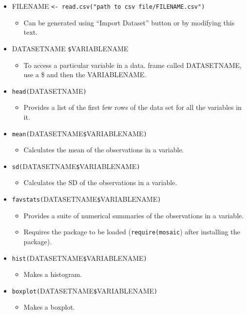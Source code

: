 \documentclass[]{book}
\providecommand{\tightlist}{%
  \setlength{\itemsep}{0pt}\setlength{\parskip}{0pt}}
\begin{document}
\begin{itemize}
\item
  FILENAME
  \texttt{\textless{}-\ read.csv("path\ to\ csv\ file/FILENAME.csv")}

  \begin{itemize}
  \tightlist
  \item
    Can be generated using ``Import Dataset'' button or by modifying
    this text.
  \end{itemize}
\item
  DATASETNAME \texttt{\$}VARIABLENAME

  \begin{itemize}
  \tightlist
  \item
    To access a particular variable in a data. frame called DATASETNAME,
    use a \$ and then the VARIABLENAME.
  \end{itemize}
\item
  \texttt{head(}DATASETNAME\texttt{)}

  \begin{itemize}
  \tightlist
  \item
    Provides a list of the first few rows of the data set for all the
    variables in it.
  \end{itemize}
\item
  \texttt{mean(}DATASETNAME\texttt{\$}VARIABLENAME\texttt{)}

  \begin{itemize}
  \tightlist
  \item
    Calculates the mean of the observations in a variable.
  \end{itemize}
\item
  \texttt{sd(}DATASETNAME\texttt{\$}VARIABLENAME\texttt{)}

  \begin{itemize}
  \tightlist
  \item
    Calculates the SD of the observations in a variable.
  \end{itemize}
\item
  \texttt{favstats(}DATASETNAME\texttt{\$}VARIABLENAME\texttt{)}

  \begin{itemize}
  \item
    Provides a suite of numerical summaries of the observations in a
    variable.
  \item
    Requires the package to be loaded (\texttt{require(mosaic}) after
    installing the package).
  \end{itemize}
\item
  \texttt{hist(}DATASETNAME\texttt{\$}VARIABLENAME\texttt{)}

  \begin{itemize}
  \tightlist
  \item
    Makes a histogram.
  \end{itemize}
\item
  \texttt{boxplot(}DATASETNAME\texttt{\$}VARIABLENAME\texttt{)}

  \begin{itemize}
  \tightlist
  \item
    Makes a boxplot.
  \end{itemize}
\end{itemize}
\end{document}
